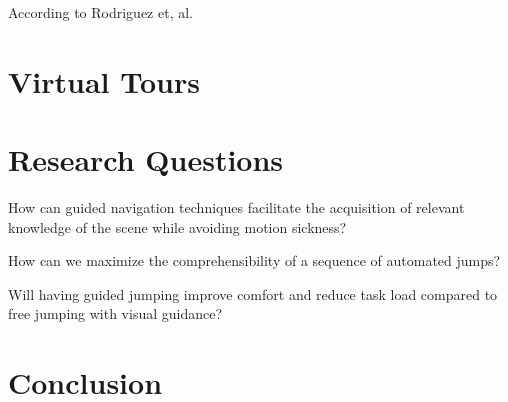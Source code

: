 According to Rodriguez et, al. 



\section{Virtual Tours}
\label{section:GJM Virtual Tours}

\section{Research Questions}
\label{section:GJM Research Questions}

\begin{researchq}
	\label{rq:rq1}
	How can guided navigation techniques facilitate the acquisition of relevant knowledge of the scene while avoiding motion sickness?
\end{researchq}
\begin{researchq}
	\label{rq:rq2}
	How can we maximize the comprehensibility of a sequence of automated jumps?
\end{researchq}
\begin{researchq}
	\label{rq:rq3}
	Will having guided jumping improve comfort and reduce task load compared to free jumping with visual guidance?
\end{researchq}

\section{Conclusion}
\label{section:GJM Conclusion}
